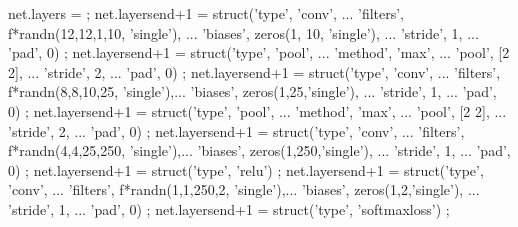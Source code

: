 net.layers = {} ;
net.layers{end+1} = struct('type', 'conv', ...
                           'filters', f*randn(12,12,1,10, 'single'), ...
                           'biases', zeros(1, 10, 'single'), ...
                           'stride', 1, ...
                           'pad', 0) ;
net.layers{end+1} = struct('type', 'pool', ...
                           'method', 'max', ...
                           'pool', [2 2], ...
                           'stride', 2, ...
                           'pad', 0) ;
net.layers{end+1} = struct('type', 'conv', ...
                           'filters', f*randn(8,8,10,25, 'single'),...
                           'biases', zeros(1,25,'single'), ...
                           'stride', 1, ...
                           'pad', 0) ;
net.layers{end+1} = struct('type', 'pool', ...
                           'method', 'max', ...
                           'pool', [2 2], ...
                           'stride', 2, ...
                           'pad', 0) ;
net.layers{end+1} = struct('type', 'conv', ...
                           'filters', f*randn(4,4,25,250, 'single'),...
                           'biases', zeros(1,250,'single'), ...
                           'stride', 1, ...
                           'pad', 0) ;
net.layers{end+1} = struct('type', 'relu') ;
net.layers{end+1} = struct('type', 'conv', ...
                           'filters', f*randn(1,1,250,2, 'single'),...
                           'biases', zeros(1,2,'single'), ...
                           'stride', 1, ...
                           'pad', 0) ;
net.layers{end+1} = struct('type', 'softmaxloss') ;
